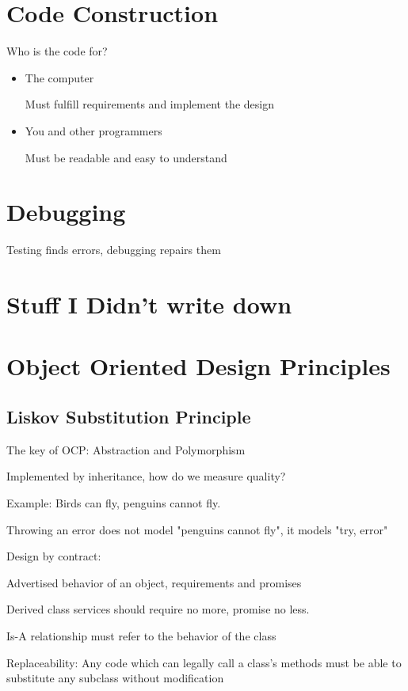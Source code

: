 \documentclass[12pt]{article}
\begin{document}
\newpage
\section{Code Construction}

Who is the code for?
\begin{itemize}
    \item The computer
    
    Must fulfill requirements and implement the design

    \item You and other programmers
    
    Must be readable and easy to understand 
\end{itemize}

\newpage
\section{Debugging}

Testing finds errors, debugging repairs them

\section{Stuff I Didn't write down}

\section{Object Oriented Design Principles}

\subsection{Liskov Substitution Principle}

The key of OCP: Abstraction and Polymorphism

Implemented by inheritance, how do we measure quality?

Example: Birds can fly, penguins cannot fly.

Throwing an error does not model "penguins cannot fly", it models "try, error"

Design by contract:

Advertised behavior of an object, requirements and promises

Derived class services should require no more, promise no less.

Is-A relationship must refer to the behavior of the class

Replaceability: Any code which can legally call a class's methods must be able to substitute any subclass without modification
\end{document}
